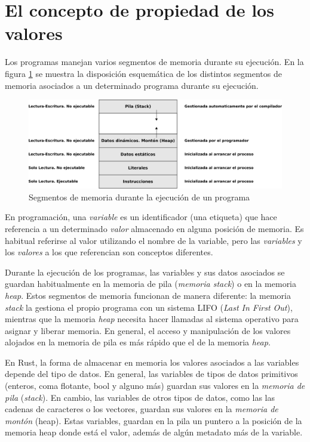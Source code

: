 \documentclass[a4paper,11pt]{extarticle}
\begin{document}
\section{El concepto de propiedad de los valores}

Los programas manejan varios segmentos de memoria durante su ejecución. En la figura \ref{fig_segmentos_memoria} se muestra la disposición esquemática de los distintos segmentos de memoria asociados a un determinado programa durante su ejecución.

\begin{figure}[htb]
\centering
	\includegraphics[width=0.75\linewidth]{img/memoria_segmentos.png}
	\caption{Segmentos de memoria durante la ejecución de un programa}
	\label{fig_segmentos_memoria}
\end{figure}

En programación, una \textit{variable} es un identificador (una etiqueta) que hace referencia a un determinado \textit{valor} almacenado en alguna posición de memoria. Es habitual referirse al valor utilizando el nombre de la variable, pero las \textit{variables} y los \textit{valores} a los que referencian son conceptos diferentes.

Durante la ejecución de los programas, las variables y sus datos asociados se guardan habitualmente en la memoria de pila (\textit{memoria stack}) o en la memoria \textit{heap}. Estos segmentos de memoria funcionan de manera diferente: la memoria \textit{stack} la gestiona el propio programa con un sistema LIFO (\textit{Last In First Out}), mientras que la memoria \textit{heap} necesita hacer llamadas al sistema operativo para asignar y liberar memoria. En general, el acceso y manipulación de los valores alojados en la memoria de pila es más rápido que el de la memoria \textit{heap}.

En Rust, la forma de almacenar en memoria los valores asociados a las variables depende del tipo de datos. En general, las variables de tipos de datos primitivos (enteros, coma flotante, bool y alguno más) guardan sus valores en la \textit{memoria de pila} (\textit{stack}). En cambio, las variables de otros tipos de datos, como las las cadenas de caracteres o los vectores, guardan sus valores en la \textit{memoria de montón} (heap). Estas variables, guardan en la pila un puntero a la posición de la memoria heap donde está el valor, además de algún metadato más de la variable.
\end{document}
